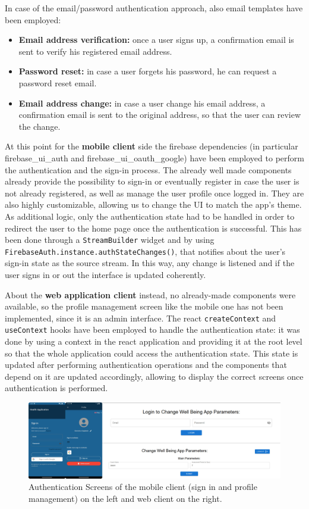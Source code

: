 \noindent In case of the email/password authentication approach, also email templates have been employed:
\begin{itemize}[nosep] %
    \item \textbf{Email address verification:} once a user signs up, a confirmation email is sent to verify his registered email address.
    \item \textbf{Password reset:} in case a user forgets his password, he can request a password reset email.
    \item \textbf{Email address change:} in case a user change his email address, a confirmation email is sent to the original address, so that the user can review the change.
\end{itemize}
\newpage
\noindent At this point for the \textbf{mobile client} side the firebase dependencies (in particular firebase\_ui\_auth and firebase\_ui\_oauth\_google) have been employed to perform the authentication and the sign-in process. The already well made components already provide the possibility to sign-in or eventually register in case the user is not already registered, as well as manage the user profile once logged in. They are also highly customizable, allowing us to change the UI to match the app's theme. As additional logic, only the authentication state had to be handled in order to redirect the user to the home page once the authentication is successful. This has been done through a \texttt{StreamBuilder} widget and by using \texttt{FirebaseAuth.instance.authStateChanges()}, that notifies about the user's sign-in state as the source stream. In this way, any change is listened and if the user signs in or out the interface is updated coherently.

\noindent About the \textbf{web application client} instead, no already-made components were available, so the profile management screen like the mobile one has not been implemented, since it is an admin interface. The react \texttt{createContext} and \texttt{useContext} hooks have been employed to handle the authentication state: it was done by using a context in the react application and providing it at the root level so that the whole application could access the authentication state. This state is updated after performing authentication operations and the components that depend on it are updated accordingly, allowing to display the correct screens once authentication is performed.   

\begin{figure}
    \includegraphics[width=1.0\linewidth]{./images/authenticationScreens.jpg}
    \caption{Authentication Screens of the mobile client (sign in and profile management) on the left and web client on the right.}
    \label{fig:authenticationScreens}
\end{figure}
\newpage
